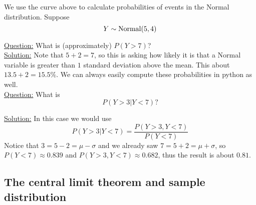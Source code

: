 \begin{example}
 We use the curve above to calculate probabilities of events in the Normal distribution. Suppose
\begin{equation*}
Y \sim {\rm Normal}(5,4)\\
\end{equation*}


 \noindent
\underline{Question:} What is (approximately) $P(Y > 7)$? \\

 \noindent
\underline{Solution:} Note that $5 + 2 =  7$, so this is asking how likely it is that a Normal variable is greater than $1$ standard deviation above the mean. This about $13.5+2 = 15.5\%$. We can always easily compute these probabilities in python as well.\\ 



 \noindent
\underline{Question:} What is
\begin{equation*}
P(Y>3|Y<7)?
\end{equation*}

 \noindent
\underline{Solution:} In this case we would use
\begin{equation*}
P(Y>3|Y<7) = \frac{P(Y>3,Y<7)}{P(Y<7)} 
\end{equation*}
Notice that $3 = 5-2 = \mu-\sigma$ and we already saw $7 = 5+2 = \mu+\sigma$, so $P(Y<7) \approx 0.839$ and $P(Y>3,Y<7) \approx 0.682$, thus the result is about $0.81$. 



\end{example}



  
  \subsection{The central limit theorem and sample distribution}
  
